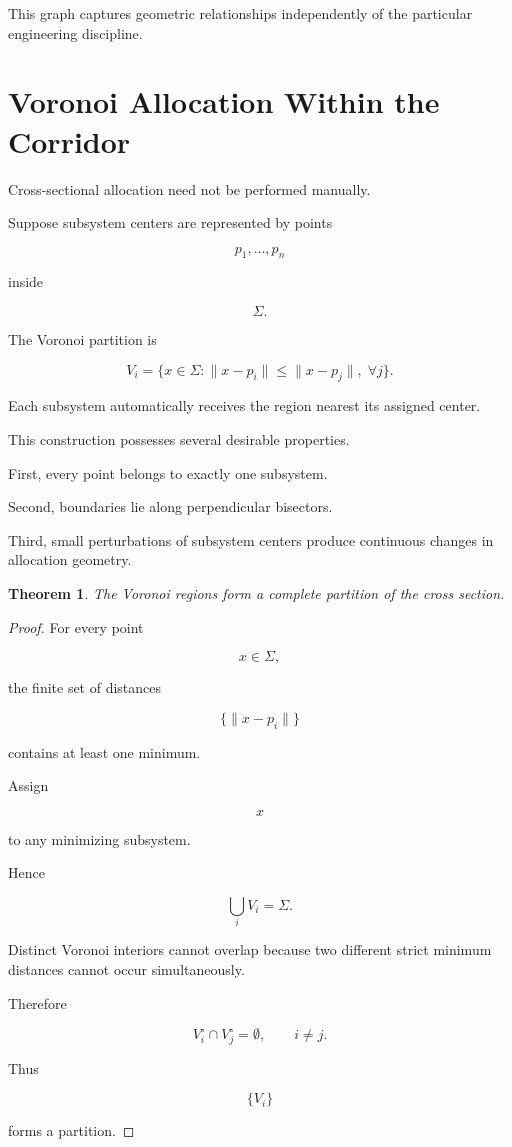 \documentclass[11pt,fleqn]{book}
\numberwithin{equation}{chapter}
\theoremstyle{plain}
\newtheorem{theorem}{Theorem}[chapter]
\theoremstyle{definition}
\theoremstyle{remark}
\begin{document}
This graph captures geometric relationships independently of the
particular engineering discipline.


\section{Voronoi Allocation Within the Corridor}

Cross-sectional allocation need not be performed manually.

Suppose subsystem centers are represented by points

\[
p_1,\ldots,p_n
\]

inside

\[
\Sigma.
\]

The Voronoi partition is

\[
V_i
=
\{
x\in\Sigma:
\|x-p_i\|
\le
\|x-p_j\|,
\;
\forall j
\}.
\]

Each subsystem automatically receives the region nearest its assigned
center.


This construction possesses several desirable properties.

First,
every point belongs to exactly one subsystem.

Second,
boundaries lie along perpendicular bisectors.

Third,
small perturbations of subsystem centers produce continuous changes in
allocation geometry.


\begin{theorem}

The Voronoi regions form a complete partition of the cross section.

\end{theorem}

\begin{proof}

For every point

\[
x
\in
\Sigma,
\]

the finite set of distances

\[
\{
\|x-p_i\|
\}
\]

contains at least one minimum.

Assign

\[
x
\]

to any minimizing subsystem.

Hence

\[
\bigcup_iV_i
=
\Sigma.
\]

Distinct Voronoi interiors cannot overlap because two different strict
minimum distances cannot occur simultaneously.

Therefore

\[
V_i^\circ
\cap
V_j^\circ
=
\emptyset,
\qquad
i\neq j.
\]

Thus

\[
\{V_i\}
\]

forms a partition.

\end{proof}
\end{document}
